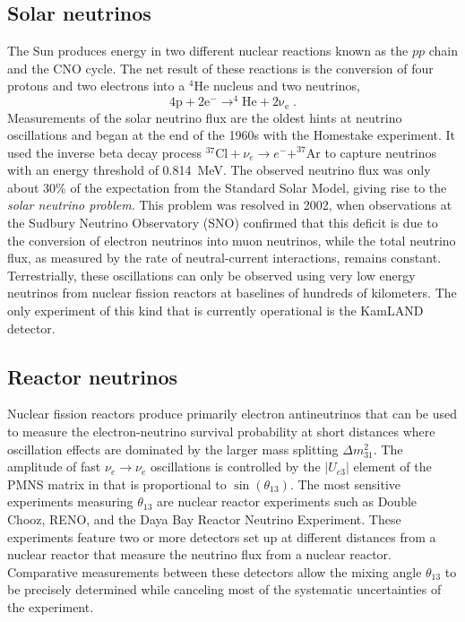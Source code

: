 \subsection{Solar neutrinos}
The Sun produces energy in two different nuclear reactions known as the $pp$ chain and the CNO cycle.
The net result of these reactions is the conversion of four protons and two electrons into a $\mathrm{^4He}$ nucleus and two neutrinos,
\begin{equation}
    \mathrm{4p + 2e^- \rightarrow ^4He + 2\nu_e }\;.
\end{equation}
Measurements of the solar neutrino flux are the oldest hints at neutrino oscillations and began at the end of the 1960s with the Homestake\cite{DAVIS199413} experiment.
It used the inverse beta decay process $^{37}\mathrm{Cl}+\nu_e \rightarrow e^- + ^{37}\mathrm{Ar}$ to capture neutrinos with an energy threshold of \SI{0.814}{MeV}.
The observed neutrino flux was only about 30\% of the expectation from the Standard Solar Model, giving rise to the \emph{solar neutrino problem}.
This problem was resolved in 2002, when observations at the Sudbury Neutrino Observatory (SNO) confirmed\cite{PhysRevLett.89.011301} that this deficit is due to the conversion of electron neutrinos into muon neutrinos, while the total neutrino flux, as measured by the rate of neutral-current interactions, remains constant.
Terrestrially, these oscillations can only be observed using very low energy neutrinos from nuclear fission reactors at baselines of hundreds of kilometers.
The only experiment of this kind that is currently operational is the KamLAND detector\cite{PhysRevLett.90.021802}.

\subsection{Reactor neutrinos}
Nuclear fission reactors produce primarily electron antineutrinos that can be used to measure the electron-neutrino survival probability at short distances where oscillation effects are dominated by the larger mass splitting $\Delta m^2_{31}$.
The amplitude of fast $\nu_e\rightarrow\nu_e$ oscillations is controlled by the $|U_{e3}|$ element of the PMNS matrix in  that is proportional to $\sin(\theta_{13})$.
The most sensitive experiments measuring $\theta_{13}$ are nuclear reactor experiments such as Double Chooz\cite{CABRERA201287}, RENO\cite{RENO:2010vlj}, and the Daya Bay Reactor Neutrino Experiment\cite{DayaBay:2007fgu}.
These experiments feature two or more detectors set up at different distances from a nuclear reactor that measure the neutrino flux from a nuclear reactor.
Comparative measurements between these detectors allow the mixing angle $\theta_{13}$ to be precisely determined while canceling most of the systematic uncertainties of the experiment.

